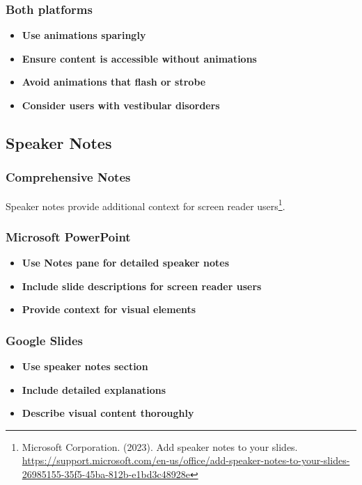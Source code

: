 \subsubsection{Both platforms}
\vspace{1em}
\begin{itemize}
\item \textbf{Use animations sparingly}
\item \textbf{Ensure content is accessible without animations}
\item \textbf{Avoid animations that flash or strobe}
\item \textbf{Consider users with vestibular disorders}
\end{itemize}
\vspace{1em}

\subsection{Speaker Notes}

\subsubsection{Comprehensive Notes}
Speaker notes provide additional context for screen reader users\footnote{Microsoft Corporation. (2023). Add speaker notes to your slides. \url{https://support.microsoft.com/en-us/office/add-speaker-notes-to-your-slides-26985155-35f5-45ba-812b-e1bd3c48928e}}.

\subsubsection{Microsoft PowerPoint}
\vspace{1em}
\begin{itemize}
\item \textbf{Use Notes pane for detailed speaker notes}
\item \textbf{Include slide descriptions for screen reader users}
\item \textbf{Provide context for visual elements}
\end{itemize}
\vspace{1em}

\subsubsection{Google Slides}
\vspace{1em}
\begin{itemize}
\item \textbf{Use speaker notes section}
\item \textbf{Include detailed explanations}
\item \textbf{Describe visual content thoroughly}
\end{itemize}
\vspace{1em}

